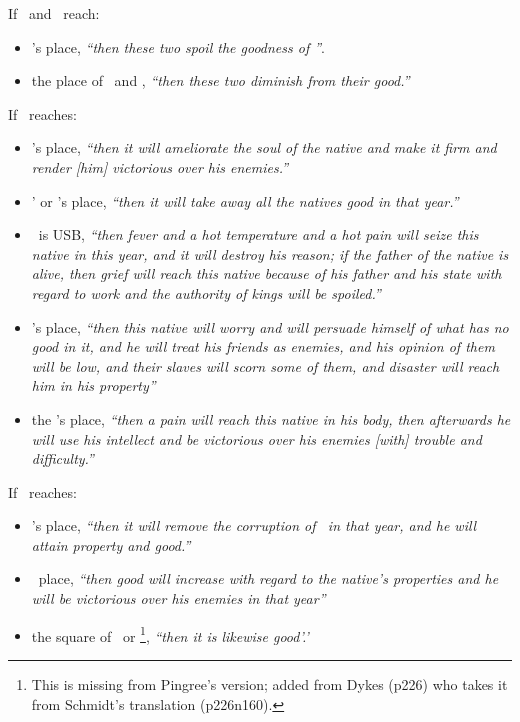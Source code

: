 If   \Saturn\, and \Mars\, reach:
\begin{itemize}[topsep=0em,itemsep=0em]
\item \Jupiter's place, \textsl{``then these two spoil the goodness of \Jupiter''}.

\item the place of \Venus\, and \Mercury, \textsl{``then these two diminish from their good.''}
\end{itemize}

If  \Mars\, reaches:

\begin{itemize}[topsep=0em,itemsep=0em]
\item \Saturn's place, \textsl{``then it will ameliorate the soul of the native and make it firm and render [him] victorious over his enemies.''}

\item  \Venus' or \Jupiter's place, \textsl{``then it will take away all the natives good in that year.''}

\item \Mars\, is USB, \textsl{``then fever and a hot temperature and a hot pain will seize this native in this year, and it will destroy his reason; if the father of the native is alive, then grief will reach this native because of his father and his state with regard to work and the authority of kings will be spoiled.''}

\item {}\Mercury's place, \textsl{``then this native will worry and will persuade himself of what has no good in it, and he will treat his friends as enemies, and his opinion of them will be low, and their slaves will scorn some of them, and disaster will reach him in his property''}

\item the \Moon's place, \textsl{``then a pain will reach this native in his body, then afterwards he will use his intellect and be victorious over his enemies [with] trouble and difficulty.''}
\end{itemize}

If  \Jupiter\, reaches:
\begin{itemize}[topsep=0em,itemsep=0em]
\item \Saturn's place, \textsl{``then it will remove the corruption of \Saturn\, in that year, and he will attain property and good.''}

\item \Mars\, place, \textsl{``then good will increase with regard to the native's properties and he will be victorious over his enemies in that year''}

\item the square of \Mars\, or \Saturn\footnote{This is missing from Pingree's version; added from Dykes (p226) who takes it from Schmidt's translation (p226n160).}, \textsl{``then it is likewise good'.'}
\end{itemize}

